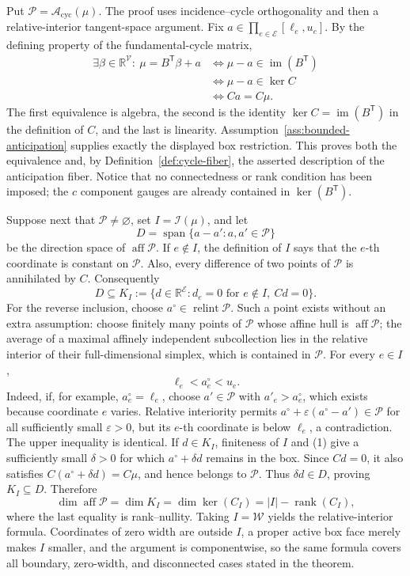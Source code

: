 Put \(\mathcal P=\mathcal A_{\mathrm{cyc}}(\mu)\).  The proof uses incidence--cycle orthogonality and then a relative-interior tangent-space argument.  Fix \(a\in\prod_{e\in\mathcal E}[\ell_e,u_e]\).  By the defining property of the fundamental-cycle matrix,
\[
 \begin{aligned}
 \exists\beta\in\mathbb R^{\mathcal V}:\ \mu=B^{\mathsf T}\beta+a
 &\Longleftrightarrow \mu-a\in\operatorname{im}(B^{\mathsf T})\\
 &\Longleftrightarrow \mu-a\in\ker C\\
 &\Longleftrightarrow Ca=C\mu .
 \end{aligned}
\]
The first equivalence is algebra, the second is the identity \(\ker C=\operatorname{im}(B^{\mathsf T})\) in the definition of \(C\), and the last is linearity.  Assumption~\ref{ass:bounded-anticipation} supplies exactly the displayed box restriction.  This proves both the equivalence and, by Definition~\ref{def:cycle-fiber}, the asserted description of the anticipation fiber.  Notice that no connectedness or rank condition has been imposed; the \(c\) component gauges are already contained in \(\ker(B^{\mathsf T})\).

Suppose next that \(\mathcal P\ne\varnothing\), set \(I=\mathcal I(\mu)\), and let
\[
 D=\operatorname{span}\{a-a':a,a'\in\mathcal P\}
\]
be the direction space of \(\operatorname{aff}\mathcal P\).  If \(e\notin I\), the definition of \(I\) says that the \(e\)-th coordinate is constant on \(\mathcal P\).  Also, every difference of two points of \(\mathcal P\) is annihilated by \(C\).  Consequently
\[
 D\subseteq K_I:=\{d\in\mathbb R^{\mathcal E}:d_e=0\text{ for }e\notin I,\ Cd=0\}.
\]
For the reverse inclusion, choose \(a^\circ\in\operatorname{relint}\mathcal P\).  Such a point exists without an extra assumption: choose finitely many points of \(\mathcal P\) whose affine hull is \(\operatorname{aff}\mathcal P\); the average of a maximal affinely independent subcollection lies in the relative interior of their full-dimensional simplex, which is contained in \(\mathcal P\).  For every \(e\in I\),
\[
 \ell_e<a^\circ_e<u_e. \tag{1}
\]
Indeed, if, for example, \(a^\circ_e=\ell_e\), choose \(a'\in\mathcal P\) with \(a'_e>a^\circ_e\), which exists because coordinate \(e\) varies.  Relative interiority permits \(a^\circ+\varepsilon(a^\circ-a')\in\mathcal P\) for all sufficiently small \(\varepsilon>0\), but its \(e\)-th coordinate is below \(\ell_e\), a contradiction.  The upper inequality is identical.  If \(d\in K_I\), finiteness of \(I\) and (1) give a sufficiently small \(\delta>0\) for which \(a^\circ+\delta d\) remains in the box.  Since \(Cd=0\), it also satisfies \(C(a^\circ+\delta d)=C\mu\), and hence belongs to \(\mathcal P\).  Thus \(\delta d\in D\), proving \(K_I\subseteq D\).  Therefore
\[
 \dim\operatorname{aff}\mathcal P
 =\dim K_I
 =\dim\ker(C_I)
 =|I|-\operatorname{rank}(C_I),
\]
where the last equality is rank--nullity.  Taking \(I=\mathcal W\) yields the relative-interior formula.  Coordinates of zero width are outside \(I\), a proper active box face merely makes \(I\) smaller, and the argument is componentwise, so the same formula covers all boundary, zero-width, and disconnected cases stated in the theorem.

